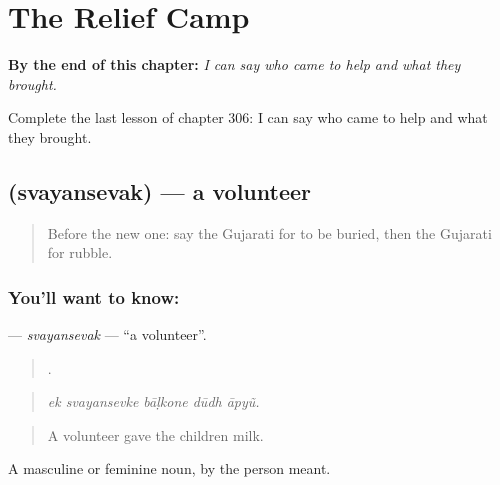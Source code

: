 
\chapter{The Relief Camp}
\label{ch:gu-the-relief-camp}

\begin{chapteropening}
\textbf{By the end of this chapter:} \emph{I can say who came to help and what they brought.}

Complete the last lesson of chapter 306: I can say who came to help and what they brought.
\end{chapteropening}

\section[\texorpdfstring{\gu{સ્વયંસેવક} (svayansevak)}{સ્વયંસેવક (svayansevak)}]{ (svayansevak) — a volunteer}

\label{lesson:GU-C306-svayansevak}



\begin{quote}
Before the new one: say the Gujarati for to be buried, then the Gujarati for rubble.
\end{quote}

\subsection*{You'll want to know: }
\textbf{} — \emph{svayansevak} — \textquotedblleft{}a volunteer\textquotedblright{}.

\begin{quote}
    .
\end{quote}

\begin{quote}
\emph{ek svayansevke bāḷkone dūdh āpyũ.}
\end{quote}

\begin{quote}
A volunteer gave the children milk.
\end{quote}

A masculine or feminine noun, by the person meant.

